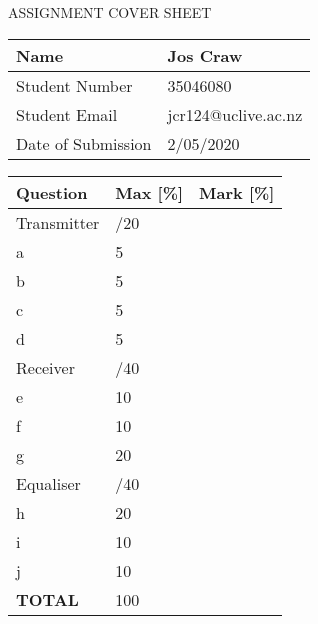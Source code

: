 \documentclass{article}
\begin{document}
\begin{center}
    {\huge ASSIGNMENT COVER SHEET}
\end{center}

\begin{center}
    \begin{tabular} { | m{5cm} | m{4cm} | }
        \hline
        {\large Name} & {\large Jos Craw}\\
        \hline
        {\large Student Number} & {\large 35046080}\\
        \hline
        {\large Student Email} & {\large jcr124@uclive.ac.nz}\\
        \hline
        {\large Date of Submission} & {\large 2/05/2020}\\
        \hline
    \end{tabular}
\end{center}

\begin{center}
    \begin{tabular} { | m{3cm} | m{3cm} | m{5cm} | }
        \hline
        {\large Question} & {\large Max [\%]} & {\large Mark [\%]}\\
        \hline
        {\large Transmitter} & {\large /20} & {\large }\\
        \hline
        {\large a} & {\large 5} & {\large}\\
        \hline
        {\large b} & {\large 5} & {\large}\\
        \hline
        {\large c} & {\large 5} & {\large}\\
        \hline
        {\large d} & {\large 5} & {\large}\\
        \hline
        {\large Receiver} & {\large /40} & {\large }\\
        \hline
        {\large e} & {\large 10} & {\large}\\
        \hline
        {\large f} & {\large 10} & {\large}\\
        \hline
        {\large g} & {\large 20} & {\large}\\
        \hline
        {\large Equaliser} & {\large /40} & {\large }\\
        \hline
        {\large h} & {\large 20} & {\large}\\
        \hline
        {\large i} & {\large 10} & {\large}\\
        \hline
        {\large j} & {\large 10} & {\large}\\
        \hline
        {\large \textbf{TOTAL}} & {\large 100} & {\large}\\
        \hline
    \end{tabular}
\end{center}
\end{document}
